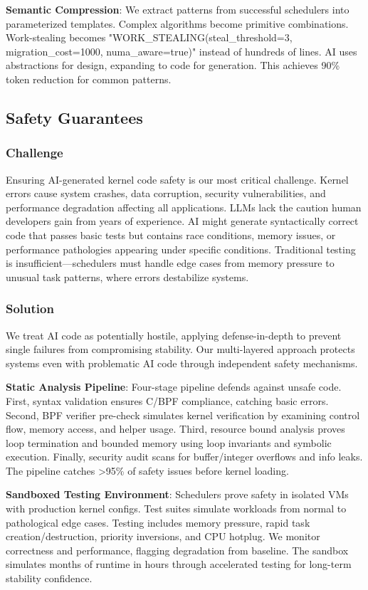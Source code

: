 \textbf{Semantic Compression}: We extract patterns from successful schedulers into parameterized templates. Complex algorithms become primitive combinations. Work-stealing becomes "WORK\_STEALING(steal\_threshold=3, migration\_cost=1000, numa\_aware=true)" instead of hundreds of lines. AI uses abstractions for design, expanding to code for generation. This achieves 90\% token reduction for common patterns.

\subsection{Safety Guarantees}

\subsubsection{Challenge}
Ensuring AI-generated kernel code safety is our most critical challenge. Kernel errors cause system crashes, data corruption, security vulnerabilities, and performance degradation affecting all applications. LLMs lack the caution human developers gain from years of experience. AI might generate syntactically correct code that passes basic tests but contains race conditions, memory issues, or performance pathologies appearing under specific conditions. Traditional testing is insufficient—schedulers must handle edge cases from memory pressure to unusual task patterns, where errors destabilize systems.

\subsubsection{Solution}
We treat AI code as potentially hostile, applying defense-in-depth to prevent single failures from compromising stability. Our multi-layered approach protects systems even with problematic AI code through independent safety mechanisms.

\textbf{Static Analysis Pipeline}: Four-stage pipeline defends against unsafe code. First, syntax validation ensures C/BPF compliance, catching basic errors. Second, BPF verifier pre-check simulates kernel verification by examining control flow, memory access, and helper usage. Third, resource bound analysis proves loop termination and bounded memory using loop invariants and symbolic execution. Finally, security audit scans for buffer/integer overflows and info leaks. The pipeline catches >95\% of safety issues before kernel loading.

\textbf{Sandboxed Testing Environment}: Schedulers prove safety in isolated VMs with production kernel configs. Test suites simulate workloads from normal to pathological edge cases. Testing includes memory pressure, rapid task creation/destruction, priority inversions, and CPU hotplug. We monitor correctness and performance, flagging degradation from baseline. The sandbox simulates months of runtime in hours through accelerated testing for long-term stability confidence.

